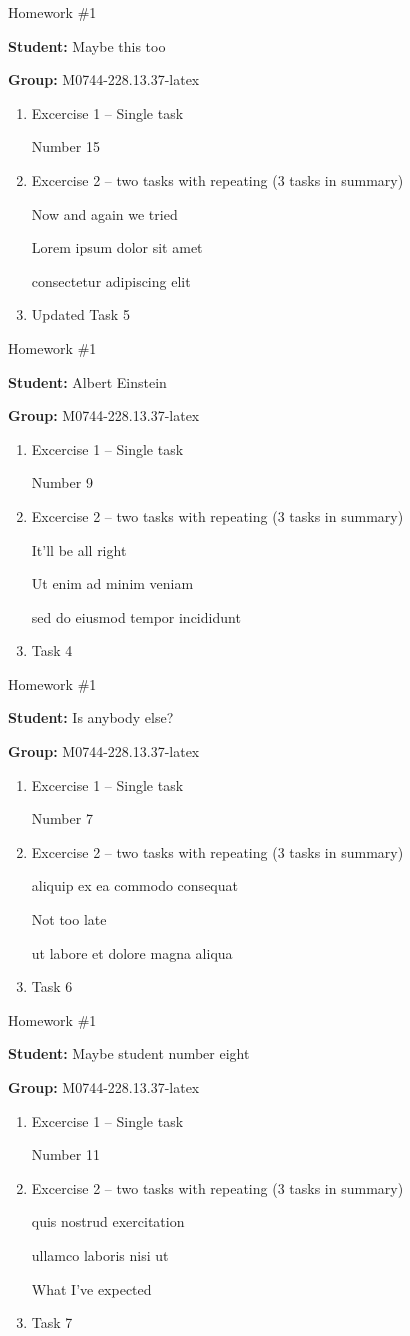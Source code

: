 \documentclass[12pt, fleqn, a4paper]{article}
\newcommand{\preamble}{\lipsum[1]}
\newcommand{\generatepage}[4]{
	\begin{center}
		{\Large #1}

		\textbf{Student:} #2

		\textbf{Group:} #3

	\end{center}

	\vspace{10pt}

	\preamble

	\begin{enumerate}
		#4
	\end{enumerate}

	\pagebreak
}
\begin{document}
	\generatepage{Homework \#1}{Maybe this too}{M0744-228.13.37-latex}{
		\item Excercise 1 -- Single task

			Number 15
		\item Excercise 2 -- two tasks with repeating (3 tasks in summary)

			Now and again we tried

			Lorem ipsum dolor sit amet

			consectetur adipiscing elit
		\item 

			Updated Task 5
	}

	\generatepage{Homework \#1}{Albert Einstein}{M0744-228.13.37-latex}{
		\item Excercise 1 -- Single task

			Number 9
		\item Excercise 2 -- two tasks with repeating (3 tasks in summary)

			It'll be all right

			Ut enim ad minim veniam

			sed do eiusmod tempor incididunt 
		\item 

			Task 4
	}

	\generatepage{Homework \#1}{Is anybody else?}{M0744-228.13.37-latex}{
		\item Excercise 1 -- Single task

			Number 7
		\item Excercise 2 -- two tasks with repeating (3 tasks in summary)

			aliquip ex ea commodo consequat

			Not too late

			ut labore et dolore magna aliqua 
		\item 

			Task 6
	}

	\generatepage{Homework \#1}{Maybe student number eight}{M0744-228.13.37-latex}{
		\item Excercise 1 -- Single task

			Number 11
		\item Excercise 2 -- two tasks with repeating (3 tasks in summary)

			quis nostrud exercitation 

			ullamco laboris nisi ut 

			What I've expected
		\item 

			Task 7
	}
\end{document}
